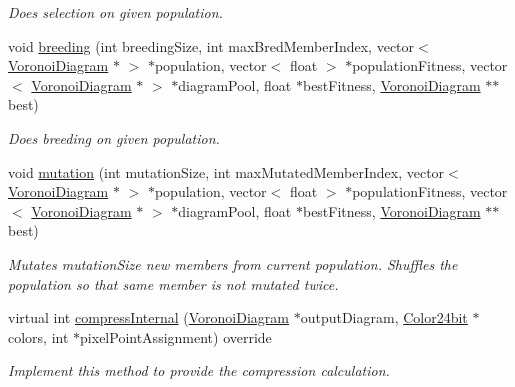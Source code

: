 \begin{DoxyCompactItemize}
\begin{DoxyCompactList}\small\item\em Does selection on given population. \end{DoxyCompactList}\item 
void \hyperlink{classlossycompressor_1_1_evolutionary_algorithm_ab6bdef7eff196720ed733561e1589411}{breeding} (int breeding\+Size, int max\+Bred\+Member\+Index, vector$<$ \hyperlink{structlossycompressor_1_1_voronoi_diagram}{Voronoi\+Diagram} $\ast$ $>$ $\ast$population, vector$<$ float $>$ $\ast$population\+Fitness, vector$<$ \hyperlink{structlossycompressor_1_1_voronoi_diagram}{Voronoi\+Diagram} $\ast$ $>$ $\ast$diagram\+Pool, float $\ast$best\+Fitness, \hyperlink{structlossycompressor_1_1_voronoi_diagram}{Voronoi\+Diagram} $\ast$$\ast$best)\hypertarget{classlossycompressor_1_1_evolutionary_algorithm_ab6bdef7eff196720ed733561e1589411}{}\label{classlossycompressor_1_1_evolutionary_algorithm_ab6bdef7eff196720ed733561e1589411}

\begin{DoxyCompactList}\small\item\em Does breeding on given population. \end{DoxyCompactList}\item 
void \hyperlink{classlossycompressor_1_1_evolutionary_algorithm_ad4a888519faba7e6fb34e237b6b8672a}{mutation} (int mutation\+Size, int max\+Mutated\+Member\+Index, vector$<$ \hyperlink{structlossycompressor_1_1_voronoi_diagram}{Voronoi\+Diagram} $\ast$ $>$ $\ast$population, vector$<$ float $>$ $\ast$population\+Fitness, vector$<$ \hyperlink{structlossycompressor_1_1_voronoi_diagram}{Voronoi\+Diagram} $\ast$ $>$ $\ast$diagram\+Pool, float $\ast$best\+Fitness, \hyperlink{structlossycompressor_1_1_voronoi_diagram}{Voronoi\+Diagram} $\ast$$\ast$best)\hypertarget{classlossycompressor_1_1_evolutionary_algorithm_ad4a888519faba7e6fb34e237b6b8672a}{}\label{classlossycompressor_1_1_evolutionary_algorithm_ad4a888519faba7e6fb34e237b6b8672a}

\begin{DoxyCompactList}\small\item\em Mutates mutation\+Size new members from current population. Shuffles the population so that same member is not mutated twice. \end{DoxyCompactList}\item 
virtual int \hyperlink{classlossycompressor_1_1_evolutionary_algorithm_a9fcfb7a87adc89ea05046ae9b352c64c}{compress\+Internal} (\hyperlink{structlossycompressor_1_1_voronoi_diagram}{Voronoi\+Diagram} $\ast$output\+Diagram, \hyperlink{structlossycompressor_1_1_color24bit}{Color24bit} $\ast$colors, int $\ast$pixel\+Point\+Assignment) override\hypertarget{classlossycompressor_1_1_evolutionary_algorithm_a9fcfb7a87adc89ea05046ae9b352c64c}{}\label{classlossycompressor_1_1_evolutionary_algorithm_a9fcfb7a87adc89ea05046ae9b352c64c}

\begin{DoxyCompactList}\small\item\em Implement this method to provide the compression calculation. \end{DoxyCompactList}\end{DoxyCompactItemize}
